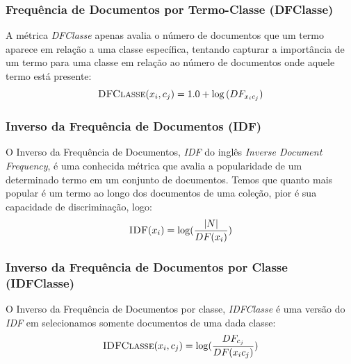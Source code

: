 \subsubsection{Frequência de Documentos por Termo-Classe (DFClasse)}
\label{subsubsection::sumdf}

A métrica \textit{DFClasse} apenas avalia o número de documentos que um termo aparece em relação a uma classe específica, tentando capturar a importância de um termo para uma classe em relação ao número de documentos onde aquele termo está presente:
\begin{equation}\label{eqn::sumtf}
 \textsc{DFClasse}(x_i,c_j) = 1.0 + \log{ ( DF_{x_ic_j} ) }
\end{equation}


\subsubsection{Inverso da Frequência de Documentos (IDF)}
\label{subsubsection::idf}

O Inverso da Frequência de Documentos, \textit{IDF} do inglês \textit{Inverse Document Frequency}, é uma conhecida métrica que avalia a popularidade de um determinado termo em um conjunto de documentos. Temos que quanto mais popular é um termo ao longo dos documentos de uma coleção, pior é sua capacidade de discriminação, logo:
\begin{equation}\label{eqn::tficf}
 \textsc{IDF}(x_i) = \log( \frac{|N|} {DF(x_i)} )
\end{equation}


\subsubsection{Inverso da Frequência de Documentos por Classe (IDFClasse)}
\label{subsubsection::idf}

O Inverso da Frequência de Documentos por classe, \textit{IDFClasse} é uma versão do \textit{IDF} em selecionamos somente documentos de uma dada classe:
\begin{equation}\label{eqn::tficf}
 \textsc{IDFClasse}(x_i,c_j) = \log( \frac{DF_{c_j}} {DF(x_ic_j)} )
\end{equation}



